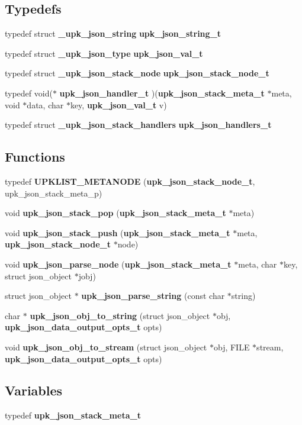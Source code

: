 \subsection*{Typedefs}
\begin{DoxyCompactItemize}
\item 
typedef struct {\bf \_\-upk\_\-json\_\-string} {\bf upk\_\-json\_\-string\_\-t}
\item 
typedef struct {\bf \_\-upk\_\-json\_\-type} {\bf upk\_\-json\_\-val\_\-t}
\item 
typedef struct {\bf \_\-upk\_\-json\_\-stack\_\-node} {\bf upk\_\-json\_\-stack\_\-node\_\-t}
\item 
typedef void($\ast$ {\bf upk\_\-json\_\-handler\_\-t} )({\bf upk\_\-json\_\-stack\_\-meta\_\-t} $\ast$meta, void $\ast$data, char $\ast$key, {\bf upk\_\-json\_\-val\_\-t} v)
\item 
typedef struct {\bf \_\-upk\_\-json\_\-stack\_\-handlers} {\bf upk\_\-json\_\-handlers\_\-t}
\end{DoxyCompactItemize}
\subsection*{Functions}
\begin{DoxyCompactItemize}
\item 
typedef {\bf UPKLIST\_\-METANODE} ({\bf upk\_\-json\_\-stack\_\-node\_\-t}, upk\_\-json\_\-stack\_\-meta\_\-p)
\item 
void {\bf upk\_\-json\_\-stack\_\-pop} ({\bf upk\_\-json\_\-stack\_\-meta\_\-t} $\ast$meta)
\item 
void {\bf upk\_\-json\_\-stack\_\-push} ({\bf upk\_\-json\_\-stack\_\-meta\_\-t} $\ast$meta, {\bf upk\_\-json\_\-stack\_\-node\_\-t} $\ast$node)
\item 
void {\bf upk\_\-json\_\-parse\_\-node} ({\bf upk\_\-json\_\-stack\_\-meta\_\-t} $\ast$meta, char $\ast$key, struct json\_\-object $\ast$jobj)
\item 
struct json\_\-object $\ast$ {\bf upk\_\-json\_\-parse\_\-string} (const char $\ast$string)
\item 
char $\ast$ {\bf upk\_\-json\_\-obj\_\-to\_\-string} (struct json\_\-object $\ast$obj, {\bf upk\_\-json\_\-data\_\-output\_\-opts\_\-t} opts)
\item 
void {\bf upk\_\-json\_\-obj\_\-to\_\-stream} (struct json\_\-object $\ast$obj, FILE $\ast$stream, {\bf upk\_\-json\_\-data\_\-output\_\-opts\_\-t} opts)
\end{DoxyCompactItemize}
\subsection*{Variables}
\begin{DoxyCompactItemize}
\item 
typedef {\bf upk\_\-json\_\-stack\_\-meta\_\-t}
\end{DoxyCompactItemize}


